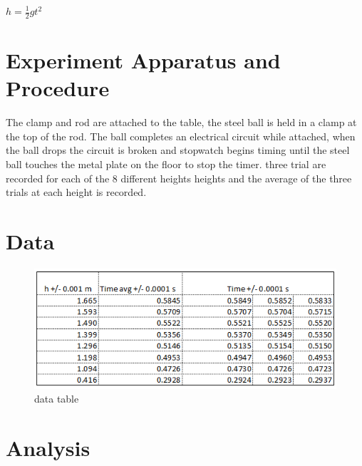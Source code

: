 \documentclass[12pt]{report}
\begin{document}
\begin{center}
$h = \frac{1}{2}gt^{2}$
\end{center}

\section{Experiment Apparatus and Procedure}
The clamp and rod are attached to the table, the steel ball is held in a clamp at the top of the rod. The ball completes an electrical circuit while attached, when the ball drops the circuit is broken and stopwatch begins timing until the steel ball touches the metal plate on the floor to stop the timer. three trial are recorded for each of the 8 different heights heights and the average of the three trials at each height is recorded.


\section{Data}

\begin{figure}[H]
    \centering
    \includegraphics[width=\textwidth]{table}
    \caption{data table}
    \label{fig:table}
\end{figure}

\section{Analysis}
\end{document}
